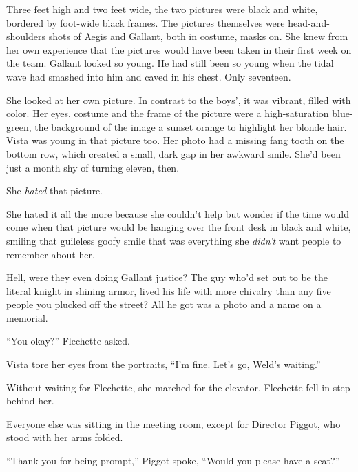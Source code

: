 Three feet high and two feet wide, the two pictures were black and white, bordered by foot-wide black frames.  The pictures themselves were head-and-shoulders shots of Aegis and Gallant, both in costume, masks on.  She knew from her own experience that the pictures would have been taken in their first week on the team.  Gallant looked so young.  He had still been so young when the tidal wave had smashed into him and caved in his chest.  Only seventeen.



She looked at her own picture.  In contrast to the boys', it was vibrant, filled with color.  Her eyes, costume and the frame of the picture were a high-saturation blue-green, the background of the image a sunset orange to highlight her blonde hair.  Vista was young in that picture too.  Her photo had a missing fang tooth on the bottom row, which created a small, dark gap in her awkward smile.  She'd been just a month shy of turning eleven, then.



She \emph{hated} that picture.



She hated it all the more because she couldn't help but wonder if the time would come when that picture would be hanging over the front desk in black and white, smiling that guileless goofy smile that was everything she \emph{didn't} want people to remember about her.



Hell, were they even doing Gallant justice?  The guy who'd set out to be the literal knight in shining armor, lived his life with more chivalry than any five people you plucked off the street?  All he got was a photo and a name on a memorial.



``You okay?'' Flechette asked.



Vista tore her eyes from the portraits, ``I'm fine.  Let's go, Weld's waiting.''



Without waiting for Flechette, she marched for the elevator.  Flechette fell in step behind her.



Everyone else was sitting in the meeting room, except for Director Piggot, who stood with her arms folded.



``Thank you for being prompt,'' Piggot spoke, ``Would you please have a seat?''



